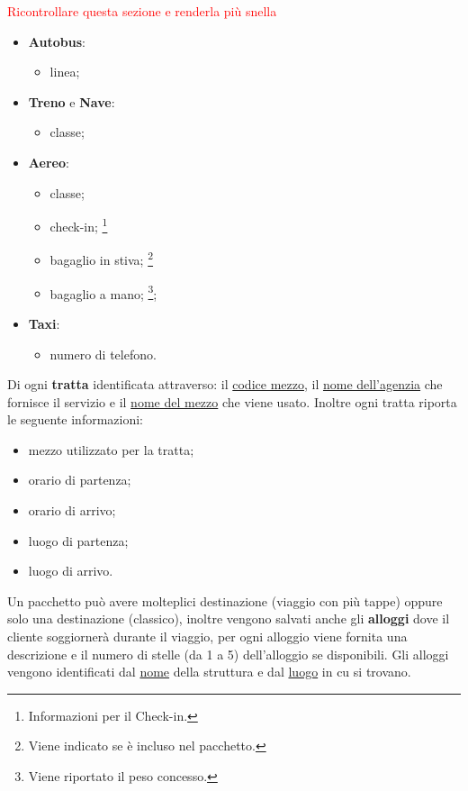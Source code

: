 \textcolor{red}{Ricontrollare questa sezione e renderla più snella}
\begin{itemize}
    \item \textbf{Autobus}:
    \begin{itemize}
        \item linea;
    \end{itemize}
    
    \item \textbf{Treno} e \textbf{Nave}:
    \begin{itemize}
        \item classe;
    \end{itemize}
    
     \item \textbf{Aereo}:
     \begin{itemize}
        \item classe;
        \item check-in; \footnote{Informazioni per il Check-in.}
        \item bagaglio in stiva; \footnote{Viene indicato se è incluso nel pacchetto.}
        \item bagaglio a mano; \footnote{Viene riportato il peso concesso.};
     \end{itemize}
     
     \item \textbf{Taxi}:
     \begin{itemize}
        \item numero di telefono.
     \end{itemize}
\end{itemize}
\noindent
Di ogni \textbf{tratta} identificata attraverso: il \underline{codice mezzo}, il \underline{nome dell'agenzia} che fornisce il servizio e il \underline{nome del mezzo} che viene usato. Inoltre ogni tratta riporta le seguente informazioni:
\begin{multicols}{2}
    \begin{itemize}
        \item mezzo utilizzato per la tratta;
        \item orario di partenza;
        \item orario di arrivo;
        \item luogo di partenza;
        \item luogo di arrivo.
    \end{itemize}
\end{multicols}
\noindent
%
%
Un pacchetto può avere molteplici destinazione (viaggio con più tappe) oppure solo una destinazione (classico), inoltre vengono salvati anche gli \textbf{alloggi} dove il cliente soggiornerà durante il viaggio, per ogni alloggio viene fornita una descrizione e il numero di stelle (da 1 a 5) dell'alloggio se disponibili. Gli alloggi vengono identificati dal \underline{nome} della struttura e dal \underline{luogo} in cu si trovano.


